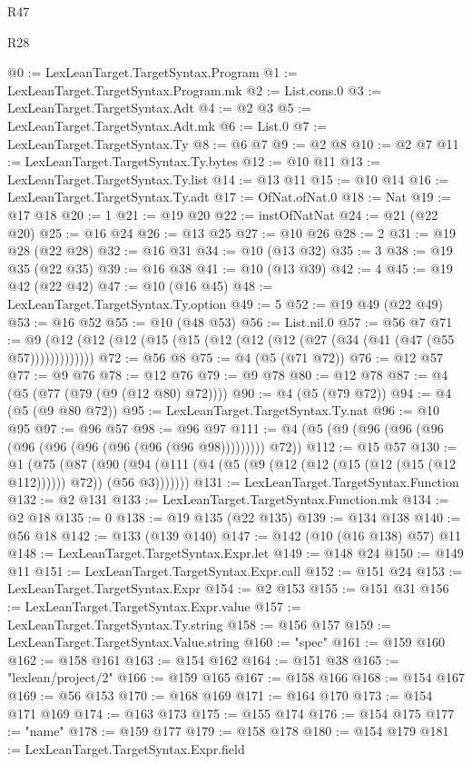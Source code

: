 \begin{lexlean}{R47}
\begin{lexlean}{R28}
\begin{coremodule}
{{{{{{{{{{{{{{{{{{{{{{{{{{{{{{{{{{{{{{{{{{{{{{{{{{{{{{{{{{{{{{{{{{{{{{{{{{{{{{{{{{{{{{{{{{{{{{{{{{{{{{{{{{{{{{{{{{{{{{{{{{{{{{{{{{{{{@0 := LexLeanTarget.TargetSyntax.Program
@1 := LexLeanTarget.TargetSyntax.Program.mk
@2 := List.cons.{0}
@3 := LexLeanTarget.TargetSyntax.Adt
@4 := @2 @3
@5 := LexLeanTarget.TargetSyntax.Adt.mk
@6 := List.{0}
@7 := LexLeanTarget.TargetSyntax.Ty
@8 := @6 @7
@9 := @2 @8
@10 := @2 @7
@11 := LexLeanTarget.TargetSyntax.Ty.bytes
@12 := @10 @11
@13 := LexLeanTarget.TargetSyntax.Ty.list
@14 := @13 @11
@15 := @10 @14
@16 := LexLeanTarget.TargetSyntax.Ty.adt
@17 := OfNat.ofNat.{0}
@18 := Nat
@19 := @17 @18
@20 := 1
@21 := @19 @20
@22 := instOfNatNat
@24 := @21 (@22 @20)
@25 := @16 @24
@26 := @13 @25
@27 := @10 @26
@28 := 2
@31 := @19 @28 (@22 @28)
@32 := @16 @31
@34 := @10 (@13 @32)
@35 := 3
@38 := @19 @35 (@22 @35)
@39 := @16 @38
@41 := @10 (@13 @39)
@42 := 4
@45 := @19 @42 (@22 @42)
@47 := @10 (@16 @45)
@48 := LexLeanTarget.TargetSyntax.Ty.option
@49 := 5
@52 := @19 @49 (@22 @49)
@53 := @16 @52
@55 := @10 (@48 @53)
@56 := List.nil.{0}
@57 := @56 @7
@71 := @9 (@12 (@12 (@12 (@15 (@15 (@12 (@12 (@12 (@27 (@34 (@41 (@47 (@55 @57)))))))))))))
@72 := @56 @8
@75 := @4 (@5 (@71 @72))
@76 := @12 @57
@77 := @9 @76
@78 := @12 @76
@79 := @9 @78
@80 := @12 @78
@87 := @4 (@5 (@77 (@79 (@9 (@12 @80) @72))))
@90 := @4 (@5 (@79 @72))
@94 := @4 (@5 (@9 @80 @72))
@95 := LexLeanTarget.TargetSyntax.Ty.nat
@96 := @10 @95
@97 := @96 @57
@98 := @96 @97
@111 := @4 (@5 (@9 (@96 (@96 (@96 (@96 (@96 (@96 (@96 (@96 (@96 @98))))))))) @72))
@112 := @15 @57
@130 := @1
    (@75
      (@87 (@90 (@94 (@111 (@4 (@5 (@9 (@12 (@12 (@15 (@12 (@15 (@12 @112)))))) @72)) (@56 @3)))))))
@131 := LexLeanTarget.TargetSyntax.Function
@132 := @2 @131
@133 := LexLeanTarget.TargetSyntax.Function.mk
@134 := @2 @18
@135 := 0
@138 := @19 @135 (@22 @135)
@139 := @134 @138
@140 := @56 @18
@142 := @133 (@139 @140)
@147 := @142 (@10 (@16 @138) @57) @11
@148 := LexLeanTarget.TargetSyntax.Expr.let
@149 := @148 @24
@150 := @149 @11
@151 := LexLeanTarget.TargetSyntax.Expr.call
@152 := @151 @24
@153 := LexLeanTarget.TargetSyntax.Expr
@154 := @2 @153
@155 := @151 @31
@156 := LexLeanTarget.TargetSyntax.Expr.value
@157 := LexLeanTarget.TargetSyntax.Ty.string
@158 := @156 @157
@159 := LexLeanTarget.TargetSyntax.Value.string
@160 := "spec"
@161 := @159 @160
@162 := @158 @161
@163 := @154 @162
@164 := @151 @38
@165 := "lexlean/project/2"
@166 := @159 @165
@167 := @158 @166
@168 := @154 @167
@169 := @56 @153
@170 := @168 @169
@171 := @164 @170
@173 := @154 @171 @169
@174 := @163 @173
@175 := @155 @174
@176 := @154 @175
@177 := "name"
@178 := @159 @177
@179 := @158 @178
@180 := @154 @179
@181 := LexLeanTarget.TargetSyntax.Expr.field
}}}}}}}}}}}}}}}}}}}}}}}}}}}}}}}}}}}}}}}}}}}}}}}}}}}}}}}}}}}}}}}}}}}}}}}}}}}}}}}}}}}}}}}}}}}}}}}}}}}}}}}}}}}}}}}}}}}}}}}}}}}}}}}}}}}}}
\end{coremodule}
\end{lexlean}
\end{lexlean}
